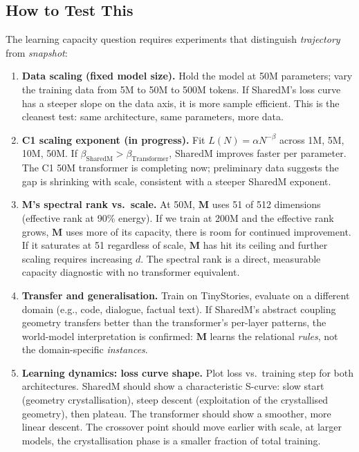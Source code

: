 \documentclass[11pt, a4paper]{article}
\newcommand{\M}{\mathbf{M}}
\theoremstyle{remark}
\begin{document}
\subsection{How to Test This}

The learning capacity question requires experiments that distinguish \emph{trajectory} from \emph{snapshot}:

\begin{enumerate}[nosep]
    \item \textbf{Data scaling (fixed model size).}
    Hold the model at 50M parameters; vary the training data from 5M to 50M to 500M tokens.
    If SharedM's loss curve has a steeper slope on the data axis, it is more sample efficient.
    This is the cleanest test: same architecture, same parameters, more data.

    \item \textbf{C1 scaling exponent (in progress).}
    Fit $L(N) = \alpha N^{-\beta}$ across 1M, 5M, 10M, 50M.
    If $\beta_{\text{SharedM}} > \beta_{\text{Transformer}}$, SharedM improves faster per parameter.
    The C1 50M transformer is completing now; preliminary data suggests the gap is shrinking with scale, consistent with a steeper SharedM exponent.

    \item \textbf{M's spectral rank vs.\ scale.}
    At 50M, $\M$ uses 51 of 512 dimensions (effective rank at 90\% energy).
    If we train at 200M and the effective rank grows, $\M$ uses more of its capacity, there is room for continued improvement.
    If it saturates at 51 regardless of scale, $\M$ has hit its ceiling and further scaling requires increasing $d$.
    The spectral rank is a direct, measurable capacity diagnostic with no transformer equivalent.

    \item \textbf{Transfer and generalisation.}
    Train on TinyStories, evaluate on a different domain (e.g., code, dialogue, factual text).
    If SharedM's abstract coupling geometry transfers better than the transformer's per-layer patterns, the world-model interpretation is confirmed: $\M$ learns the relational \emph{rules}, not the domain-specific \emph{instances}.

    \item \textbf{Learning dynamics: loss curve shape.}
    Plot loss vs.\ training step for both architectures.
    SharedM should show a characteristic S-curve: slow start (geometry crystallisation), steep descent (exploitation of the crystallised geometry), then plateau.
    The transformer should show a smoother, more linear descent.
    The crossover point should move earlier with scale, at larger models, the crystallisation phase is a smaller fraction of total training.
\end{enumerate}
\end{document}
